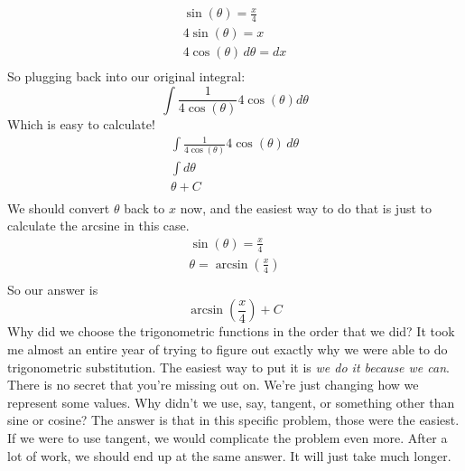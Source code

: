 \documentclass[../revisedmain.tex]{subfiles}
\begin{document}
	\begin{gather*}
		\sin(\theta)=\frac{x}{4}\\
		4\sin(\theta)=x\\
		4\cos(\theta)\,d\theta=dx\\
	\end{gather*}
	So plugging back into our original integral:
	\[\int\frac{1}{4\cos(\theta)}4\cos(\theta)d\theta\]
	Which is easy to calculate!
	\begin{gather*}
		\int\frac{1}{4\cos(\theta)}4\cos(\theta)\,d\theta\\
		\int d\theta\\
		\theta +C\\
	\end{gather*}
	We should convert $\theta$ back to $x$ now, and the easiest way to do that is just to calculate the arcsine in this case.
	\begin{gather*}
		\sin(\theta)=\frac{x}{4}\\
		\theta=\arcsin\left(\frac{x}{4}\right)\\
	\end{gather*}
	So our answer is\[\arcsin\left(\frac{x}{4}\right)+C\]
	Why did we choose the trigonometric functions in the order that we did? It took me almost an entire year of trying to figure out exactly why we were able to do trigonometric substitution. The easiest way to put it is \textit{we do it because we can}. There is no secret that you're missing out on. We're just changing how we represent some values. Why didn't we use, say, tangent, or something other than sine or cosine? The answer is that in this specific problem, those were the easiest. If we were to use tangent, we would complicate the problem even more. After a lot of work, we should end up at the same answer. It will just take much longer.
\end{document}
